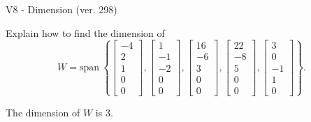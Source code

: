 \begin{exercise}
  \begin{exerciseTitle}V8 - Dimension (ver. 298)\end{exerciseTitle}
  \begin{exerciseStatement}
    Explain how to find the dimension of 
\[W=\mathrm{span}\ \left\{\left[\begin{array}{r}
-4 \\
2 \\
1 \\
0 \\
0
\end{array}\right] , \left[\begin{array}{r}
1 \\
-1 \\
-2 \\
0 \\
0
\end{array}\right] , \left[\begin{array}{r}
16 \\
-6 \\
3 \\
0 \\
0
\end{array}\right] , \left[\begin{array}{r}
22 \\
-8 \\
5 \\
0 \\
0
\end{array}\right] , \left[\begin{array}{r}
3 \\
0 \\
-1 \\
1 \\
0
\end{array}\right]\right\}.\]



  \end{exerciseStatement}
  \begin{exerciseAnswer}
   The dimension of \(W\) is  \(3\).
  


  \end{exerciseAnswer}
\end{exercise}